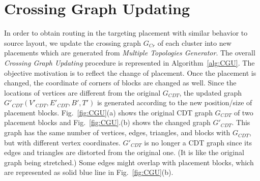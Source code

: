   \section{Crossing Graph Updating}\label{sec:updateG}


    In order to obtain routing in the targeting placement with similar behavior to source layout, we update the crossing graph $G_{Cr}$ of each cluster into new placements which are generated from {\it Multiple Topologies Generator}. The overall {\it Crossing Graph Updating} procedure is represented in Algorithm~\ref{alg:CGU}. The objective motivation is to reflect the change of placement. Once the placement is changed, the coordinate of corners of blocks are changed as well. Since the locations of vertices are different from the original $G_{CDT}$, the updated graph $G'_{CDT}(V'_{CDT},E'_{CDT},B',T')$ is generated according to the new position/size of placement blocks. Fig.~\ref{fig:CGU}(a) shows the original CDT graph $G_{CDT}$ of two placement blocks and Fig.~\ref{fig:CGU}.(b) shows the changed graph $G'_{CDT}$. This graph has the same number of vertices, edges, triangles, and blocks with $G_{CDT}$, but with different vertex coordinates. $G'_{CDT}$ is no longer a CDT graph since its edges and triangles are distorted from the original one. (It is like the original graph being stretched.) Some edges might overlap with placement blocks, which are represented as solid blue line in Fig.~\ref{fig:CGU}(b).

